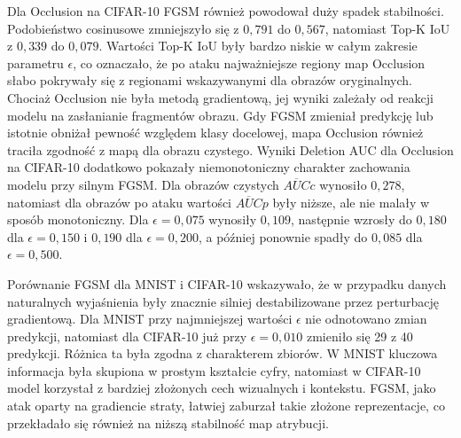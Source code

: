 Dla Occlusion na CIFAR-10 FGSM również powodował duży spadek stabilności. Podobieństwo cosinusowe zmniejszyło się z $0{,}791$ do $0{,}567$, natomiast Top-K IoU z $0{,}339$ do $0{,}079$. Wartości Top-K IoU były bardzo niskie w całym zakresie parametru $\epsilon$, co oznaczało, że po ataku najważniejsze regiony map Occlusion słabo pokrywały się z regionami wskazywanymi dla obrazów oryginalnych. Chociaż Occlusion nie była metodą gradientową, jej wyniki zależały od reakcji modelu na zasłanianie fragmentów obrazu. Gdy FGSM zmieniał predykcję lub istotnie obniżał pewność względem klasy docelowej, mapa Occlusion również traciła zgodność z mapą dla obrazu czystego. Wyniki Deletion AUC dla Occlusion na CIFAR-10 dodatkowo pokazały niemonotoniczny charakter zachowania modelu przy silnym FGSM. Dla obrazów czystych $\overline{AUC}{c}$ wynosiło $0{,}278$, natomiast dla obrazów po ataku wartości $\overline{AUC}{p}$ były niższe, ale nie malały w sposób monotoniczny. Dla $\epsilon = 0{,}075$ wynosiły $0{,}109$, następnie wzrosły do $0{,}180$ dla $\epsilon = 0{,}150$ i $0{,}190$ dla $\epsilon = 0{,}200$, a później ponownie spadły do $0{,}085$ dla $\epsilon = 0{,}500$. 

Porównanie FGSM dla MNIST i CIFAR-10 wskazywało, że w przypadku danych naturalnych wyjaśnienia były znacznie silniej destabilizowane przez perturbację gradientową. Dla MNIST przy najmniejszej wartości $\epsilon$ nie odnotowano zmian predykcji, natomiast dla CIFAR-10 już przy $\epsilon = 0{,}010$ zmieniło się 29 z 40 predykcji. Różnica ta była zgodna z charakterem zbiorów. W MNIST kluczowa informacja była skupiona w prostym kształcie cyfry, natomiast w CIFAR-10 model korzystał z bardziej złożonych cech wizualnych i kontekstu. FGSM, jako atak oparty na gradiencie straty, łatwiej zaburzał takie złożone reprezentacje, co przekładało się również na niższą stabilność map atrybucji.
